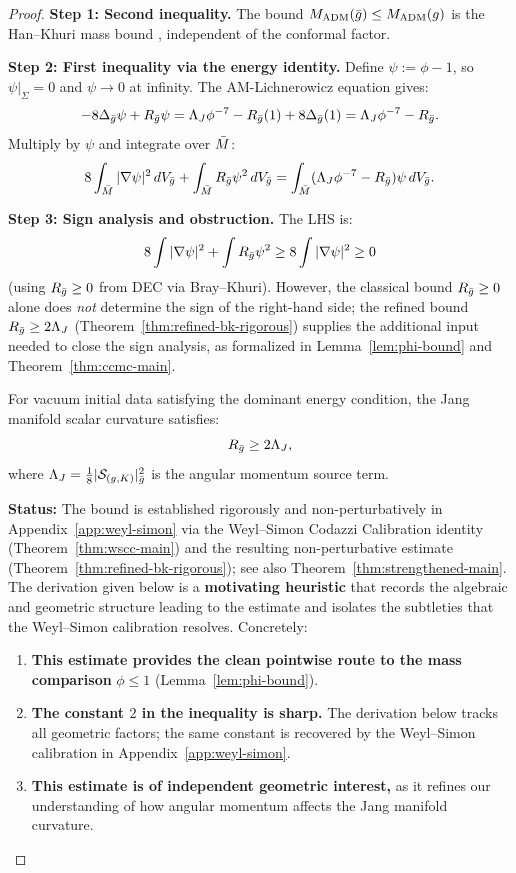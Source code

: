 \begin{proof}
\textbf{Step 1: Second inequality.}
The bound $M_{\mathrm{ADM}}(\bar{g}) \leq M_{\mathrm{ADM}}(g)$ is the Han--Khuri mass bound \cite[Theorem 3.1]{hankhuri2013}, independent of the conformal factor.

\textbf{Step 2: First inequality via the energy identity.}
Define $\psi := \phi - 1$, so $\psi|_\Sigma = 0$ and $\psi \to 0$ at infinity. The AM-Lichnerowicz equation gives:
\[
-8\Delta_{\bar{g}}\psi + R_{\bar{g}}\psi = \Lambda_J \phi^{-7} - R_{\bar{g}}(1) + 8\Delta_{\bar{g}}(1) = \Lambda_J \phi^{-7} - R_{\bar{g}}.
\]
Multiply by $\psi$ and integrate over $\bar{M}$:
\[
8\int_{\bar{M}} |\nabla\psi|^2 \, dV_{\bar{g}} + \int_{\bar{M}} R_{\bar{g}} \psi^2 \, dV_{\bar{g}} = \int_{\bar{M}} (\Lambda_J \phi^{-7} - R_{\bar{g}}) \psi \, dV_{\bar{g}}.
\]

\textbf{Step 3: Sign analysis and obstruction.}
The LHS is:
\[
8\int |\nabla\psi|^2 + \int R_{\bar{g}} \psi^2 \geq 8\int |\nabla\psi|^2 \geq 0
\]
(using $R_{\bar{g}} \geq 0$ from DEC via Bray--Khuri). However, the classical bound $R_{\bar{g}}\geq 0$ alone does \emph{not} determine the sign of the right-hand side; the refined bound $R_{\bar{g}}\geq 2\Lambda_J$ (Theorem~\ref{thm:refined-bk-rigorous}) supplies the additional input needed to close the sign analysis, as formalized in Lemma~\ref{lem:phi-bound} and Theorem~\ref{thm:ccmc-main}.

\begin{lemma}\label{lem:refined-bk}
For vacuum initial data satisfying the dominant energy condition, the Jang manifold scalar curvature satisfies:
\[
R_{\bar{g}} \geq 2\Lambda_J,
\]
where $\Lambda_J = \frac{1}{8}|\mathcal{S}_{(g,K)}|^2_{\bar{g}}$ is the angular momentum source term.
\end{lemma}

\textbf{Status:} The bound is established rigorously and non-perturbatively in Appendix~\ref{app:weyl-simon} via the Weyl--Simon Codazzi Calibration identity (Theorem~\ref{thm:wscc-main}) and the resulting non-perturbative estimate (Theorem~\ref{thm:refined-bk-rigorous}); see also Theorem~\ref{thm:strengthened-main}. The derivation given below is a \textbf{motivating heuristic} that records the algebraic and geometric structure leading to the estimate and isolates the subtleties that the Weyl--Simon calibration resolves. Concretely:
\begin{enumerate}[label=(\roman*)]
\item \textbf{This estimate provides the clean pointwise route to the mass comparison} $\phi\leq 1$ (Lemma~\ref{lem:phi-bound}).
\item \textbf{The constant $2$ in the inequality is sharp.} The derivation below tracks all geometric factors; the same constant is recovered by the Weyl--Simon calibration in Appendix~\ref{app:weyl-simon}.
\item \textbf{This estimate is of independent geometric interest,} as it refines our understanding of how angular momentum affects the Jang manifold curvature.
\end{enumerate}


\end{proof}
